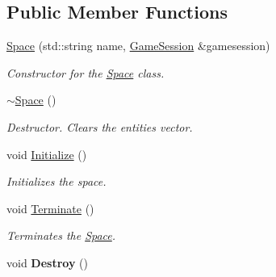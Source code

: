 \subsection*{Public Member Functions}
\begin{DoxyCompactItemize}
\item 
\hypertarget{classDCEngine_1_1Space_aafcb4a0ee05782b48eae51fce88a4bd5}{\hyperlink{classDCEngine_1_1Space_aafcb4a0ee05782b48eae51fce88a4bd5}{Space} (std\-::string name, \hyperlink{classDCEngine_1_1GameSession}{Game\-Session} \&gamesession)}\label{classDCEngine_1_1Space_aafcb4a0ee05782b48eae51fce88a4bd5}

\begin{DoxyCompactList}\small\item\em Constructor for the \hyperlink{classDCEngine_1_1Space}{Space} class. \end{DoxyCompactList}\item 
\hypertarget{classDCEngine_1_1Space_a844d3c1a2ef3318b49033b62686135c8}{\hyperlink{classDCEngine_1_1Space_a844d3c1a2ef3318b49033b62686135c8}{$\sim$\-Space} ()}\label{classDCEngine_1_1Space_a844d3c1a2ef3318b49033b62686135c8}

\begin{DoxyCompactList}\small\item\em Destructor. Clears the entities vector. \end{DoxyCompactList}\item 
\hypertarget{classDCEngine_1_1Space_a15369421840e383c094d53886ca60565}{void \hyperlink{classDCEngine_1_1Space_a15369421840e383c094d53886ca60565}{Initialize} ()}\label{classDCEngine_1_1Space_a15369421840e383c094d53886ca60565}

\begin{DoxyCompactList}\small\item\em Initializes the space. \end{DoxyCompactList}\item 
\hypertarget{classDCEngine_1_1Space_a9e083327d14ac06a48060f8fb26b92db}{void \hyperlink{classDCEngine_1_1Space_a9e083327d14ac06a48060f8fb26b92db}{Terminate} ()}\label{classDCEngine_1_1Space_a9e083327d14ac06a48060f8fb26b92db}

\begin{DoxyCompactList}\small\item\em Terminates the \hyperlink{classDCEngine_1_1Space}{Space}. \end{DoxyCompactList}\item 
\hypertarget{classDCEngine_1_1Space_a6087a92a26ccd50e59393051848cb4b5}{void {\bfseries Destroy} ()}\label{classDCEngine_1_1Space_a6087a92a26ccd50e59393051848cb4b5}


\end{DoxyCompactItemize}
